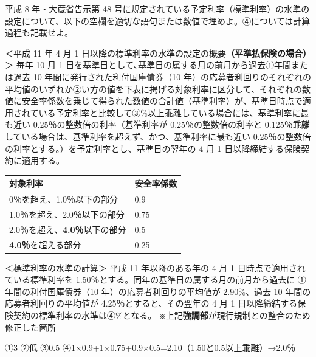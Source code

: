 \documentclass[report,gutter=10mm,fore-edge=10mm,uplatex,dvipdfmx]{jlreq}
\begin{document}

平成 8 年・大蔵省告示第 48
号に規定されている予定利率（標準利率）の水準の設定について、以下の空欄を適切な語句または数値で埋めよ。④については計算過程も記載せよ。

＜平成 11 年 4 月 1
日以降の標準利率の水準の設定の概要\textbf{（平準払保険の場合）}＞ 毎年
10 月 1 日を基準日として､基準日の属する月の前月から過去①年間または過去
10 年間に発行された利付国庫債券（10
年）の応募者利回りのそれぞれの平均値のいずれか②い方の値を下表に掲げる対象利率に区分して、それぞれの数値に安全率係数を乗じて得られた数値の合計値（基準利率）が、基準日時点で適用されている予定利率と比較して③\%以上乖離している場合には、基準利率に最も近い
0.25％の整数倍の利率（基準利率が 0.25％の整数倍の利率と
0.125％乖離している場合は、基準利率を超えず、かつ、基準利率に最も近い
0.25％の整数倍の利率とする。）を予定利率とし、基準日の翌年の 4 月 1
日以降締結する保険契約に適用する。

\begin{longtable}[]{@{}ll@{}}
\toprule
対象利率 & 安全率係数\tabularnewline
\midrule
\endhead
0％を超え、1.0％以下の部分 & 0.9\tabularnewline
1.0％を超え、2.0％以下の部分 & 0.75\tabularnewline
2.0％を超え、\textbf{4.0％}以下の部分 & 0.5\tabularnewline
\textbf{4.0％}を超える部分 & 0.25\tabularnewline
\bottomrule
\end{longtable}

＜標準利率の水準の計算＞ 平成 11 年以降のある年の 4 月 1
日時点で適用されている標準利率を
1.50％とする。同年の基準日の属する月の前月から過去に
①年間の利付国庫債券（10 年）の応募者利回りの平均値が 2.90\%、過去 10
年間の応募者利回りの平均値が 4.25％とすると、その翌年の 4 月 1
日以降締結する保険契約の標準利率の水準は④\%となる。
※上記\textbf{強調部}が現行規制との整合のため修正した箇所


①3 ②低 ③0.5 ④1×0.9+1×0.75+0.9×0.5=2.10（1.50と0.5以上乖離）→2.0％

\end{document}
